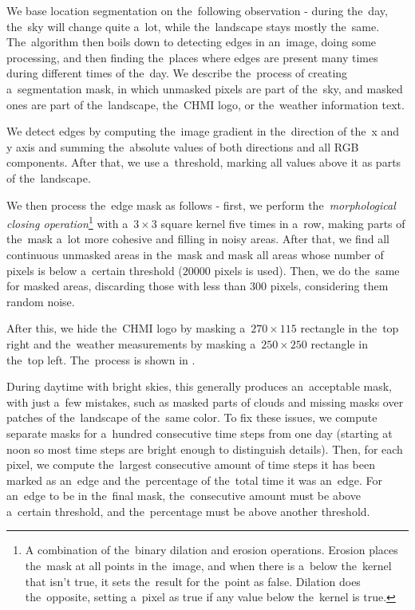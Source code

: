 We base location segmentation on the~following observation - during the~day, the~sky will change quite a~lot, while the~landscape stays mostly the~same. The~algorithm then boils down to detecting edges in an~image, doing some processing, and then finding the~places where edges are present many times during different times of the~day. We describe the~process of creating a~segmentation mask, in which unmasked pixels are part of the~sky, and masked ones are part of the~landscape, the~CHMI logo, or the~weather information text.

We detect edges by computing the~image gradient in the~direction of the~x and y axis and summing the~absolute values of both directions and all RGB components. After that, we use a~threshold, marking all values above it as parts of the~landscape.

We then process the~edge mask as follows - first, we perform the~\textit{morphological closing operation}\footnote{A combination of the~binary dilation and erosion operations. Erosion places the~mask at all points in the~image, and when there is a~below the~kernel that isn't true, it sets the~result for the~point as false. Dilation does the~opposite, setting a~pixel as true if any value below the~kernel is true.} with a~$3 \times 3$ square kernel five times in a~row, making parts of the~mask a~lot more cohesive and filling in noisy areas. After that, we find all continuous unmasked areas in the~mask and mask all areas whose number of pixels is below a~certain threshold ($20000$ pixels is used). Then, we do the~same for masked areas, discarding those with less than $300$ pixels, considering them random noise.

After this, we hide the~CHMI logo by masking a~$270 \times 115$ rectangle in the~top right and the~weather measurements by masking a~$250 \times 250$ rectangle in the~top left. The~process is shown in .


During daytime with bright skies, this generally produces an~acceptable mask, with just a~few mistakes, such as masked parts of clouds and missing masks over patches of the~landscape of the~same color. To fix these issues, we compute separate masks for a~hundred consecutive time steps from one day (starting at noon so most time steps are bright enough to distinguish details). Then, for each pixel, we compute the~largest consecutive amount of time steps it has been marked as an~edge and the~percentage of the~total time it was an~edge. For an~edge to be in the~final mask, the~consecutive amount must be above a~certain threshold, and the~percentage must be above another threshold.

